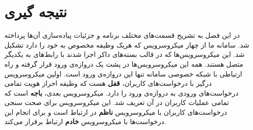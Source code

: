 \section{نتیجه گیری}
در این فصل به تشریح قسمت‌های مختلف برنامه و جزئیات پیاده‌سازی آن‌ها پرداخته شد. سامانه ما از چهار میکروسرویس که هریک وظیفه مخصوص به خود را دارد تشکیل شد. این میکروسرویس‌ها که در قالب بسته‌های داکر اجرا شدند با رابط‌های  به یکدیگر متصل هستند. همه این میکروسرویس‌ها در پشت یک ‌دروازه‌ی ورود قرار گرفته و راه ارتباطی با شبکه خصوصی سامانه تنها این ‌دروازه‌ی ورود است. اولین میکروسرویس درگیر با درخواست‌های کاربران، \textbf{قفل} هست که وظیفه احراز هویت تمامی درخواست‌های ورودی به ‌دروازه‌ی ورود را دارد. میکروسرویس بعدی، \textbf{باجه} است که تمامی عملیات کاربران در آن تعریف شد. این میکروسرویس برای صحت سنجی درخواست‌های کاربران با میکروسرویس \textbf{ناظم} در ارتباط است و برای انجام این درخواست‌ها با میکروسرویس \textbf{خادم} ارتباط برقرار می‌کند.

